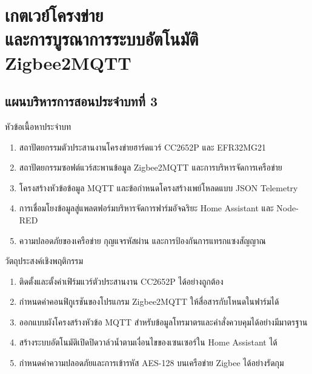 \chapter[เกตเวย์โครงข่ายและการบูรณาการระบบอัตโนมัติ Zigbee2MQTT]{เกตเวย์โครงข่าย\\และการบูรณาการระบบอัตโนมัติ Zigbee2MQTT}
\label{chap:ch03}

\section*{แผนบริหารการสอนประจำบทที่ 3}

\begin{planbox}{หัวข้อเนื้อหาประจำบท}
\begin{enumerate}[topsep=1pt, itemsep=0.5pt, partopsep=0pt, parsep=0pt, leftmargin=1.5em]
    \item สถาปัตยกรรมตัวประสานงานโครงข่ายฮาร์ดแวร์ CC2652P และ EFR32MG21
    \item สถาปัตยกรรมซอฟต์แวร์สะพานข้อมูล Zigbee2MQTT และการบริหารจัดการเครือข่าย
    \item โครงสร้างหัวข้อข้อมูล MQTT และข้อกำหนดโครงสร้างเพย์โหลดแบบ JSON Telemetry
    \item การเชื่อมโยงข้อมูลสู่แพลตฟอร์มบริหารจัดการฟาร์มอัจฉริยะ Home Assistant และ Node-RED
    \item ความปลอดภัยของเครือข่าย กุญแจรหัสผ่าน และการป้องกันการแทรกแซงสัญญาณ
\end{enumerate}
\end{planbox}

\begin{planbox}{วัตถุประสงค์เชิงพฤติกรรม}
\begin{enumerate}[topsep=1pt, itemsep=0.5pt, partopsep=0pt, parsep=0pt, leftmargin=1.5em]
    \item ติดตั้งและตั้งค่าเฟิร์มแวร์ตัวประสานงาน CC2652P ได้อย่างถูกต้อง
    \item กำหนดค่าคอนฟิกูเรชันของโปรแกรม Zigbee2MQTT ให้สื่อสารกับโหนดในฟาร์มได้
    \item ออกแบบผังโครงสร้างหัวข้อ MQTT สำหรับข้อมูลโทรมาตรและคำสั่งควบคุมได้อย่างมีมาตรฐาน
    \item สร้างระบบอัตโนมัติเปิดปิดวาล์วน้ำตามเงื่อนไขของเซนเซอร์ใน Home Assistant ได้
    \item กำหนดค่าความปลอดภัยและการเข้ารหัส AES-128 บนเครือข่าย Zigbee ได้อย่างรัดกุม
\end{enumerate}
\end{planbox}

